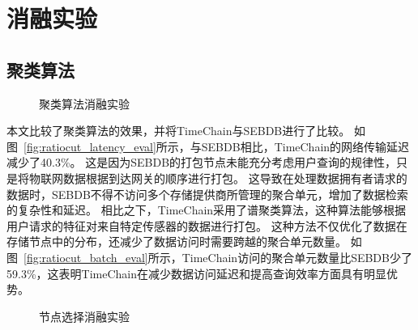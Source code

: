 \section{消融实验}
\subsection{聚类算法}
\begin{figure*}[t]
    \centering
	\begin{minipage}{0.96\linewidth}
        \caption{聚类算法消融实验} 
    \end{minipage}
\end{figure*}

本文比较了聚类算法的效果，并将TimeChain与SEBDB进行了比较。
如图~\autoref{fig:ratiocut_latency_eval}所示，与SEBDB相比，TimeChain的网络传输延迟减少了40.3\%。
这是因为SEBDB的打包节点未能充分考虑用户查询的规律性，只是将物联网数据根据到达网关的顺序进行打包。
这导致在处理数据拥有者请求的数据时，SEBDB不得不访问多个存储提供商所管理的聚合单元，增加了数据检索的复杂性和延迟。
相比之下，TimeChain采用了谱聚类算法，这种算法能够根据用户请求的特征对来自特定传感器的数据进行打包。
这种方法不仅优化了数据在存储节点中的分布，还减少了数据访问时需要跨越的聚合单元数量。
如图~\autoref{fig:ratiocut_batch_eval}所示，TimeChain访问的聚合单元数量比SEBDB少了59.3\%，这表明TimeChain在减少数据访问延迟和提高查询效率方面具有明显优势。

\begin{figure*}[t]
    \centering
    \begin{minipage}{0.96\linewidth}
        \vspace{0.5ex}
        \caption{节点选择消融实验} 
    \end{minipage}
\end{figure*}

